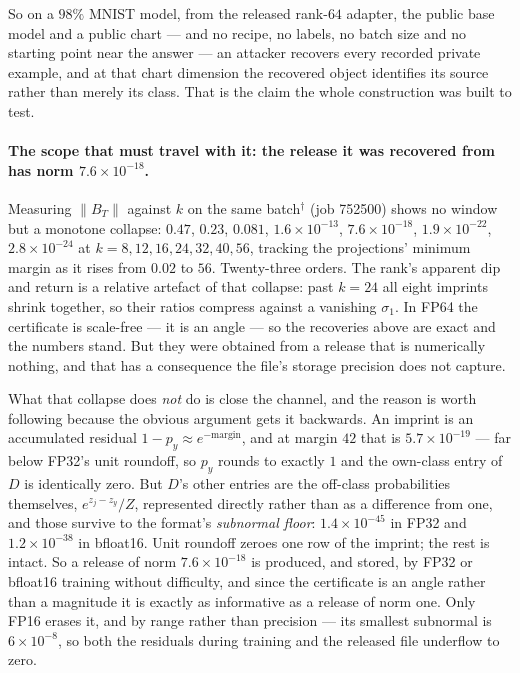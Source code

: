 So on a $98\%$ MNIST model, from the released rank-$64$ adapter, the public
base model and a public chart --- and no recipe, no labels, no batch size and
no starting point near the answer --- an attacker recovers every recorded
private example, and at that chart dimension the recovered object identifies
its source rather than merely its class. That is the claim the whole construction was built to test.

\paragraph{The scope that must travel with it: the release it was recovered
from has norm $7.6\times10^{-18}$.} Measuring $\|B_T\|$ against $k$ on the
same batch$^\dagger$ (job 752500) shows no window but a monotone collapse:
$0.47$, $0.23$, $0.081$, $1.6\times10^{-13}$, $7.6\times10^{-18}$,
$1.9\times10^{-22}$, $2.8\times10^{-24}$ at $k=8,12,16,24,32,40,56$, tracking
the projections' minimum margin as it rises from $0.02$ to $56$. Twenty-three
orders. The rank's apparent dip and return is a relative artefact of that
collapse: past $k=24$ all eight imprints shrink together, so their ratios
compress against a vanishing $\sigma_1$. In FP64 the certificate is
scale-free --- it is an angle --- so the recoveries above are exact and the
numbers stand. But they were obtained from a release that is numerically
nothing, and that has a consequence the file's storage precision does not
capture.

What that collapse does \emph{not} do is close the channel, and the reason is
worth following because the obvious argument gets it backwards. An imprint is
an accumulated residual $1-p_y\approx e^{-\text{margin}}$, and at margin $42$
that is $5.7\times10^{-19}$ --- far below FP32's unit roundoff, so
$p_y$ rounds to exactly $1$ and the own-class entry of $D$ is identically
zero. But $D$'s other entries are the off-class probabilities themselves,
$e^{z_j-z_y}/Z$, represented directly rather than as a difference from one,
and those survive to the format's \emph{subnormal floor}: $1.4\times10^{-45}$
in FP32 and $1.2\times10^{-38}$ in bfloat16. Unit roundoff zeroes one row of
the imprint; the rest is intact. So a release of norm $7.6\times10^{-18}$ is
produced, and stored, by FP32 or bfloat16 training without difficulty, and
since the certificate is an angle rather than a magnitude it is exactly as
informative as a release of norm one. Only FP16 erases it, and by range rather
than precision --- its smallest subnormal is $6\times10^{-8}$, so both the
residuals during training and the released file underflow to zero.

